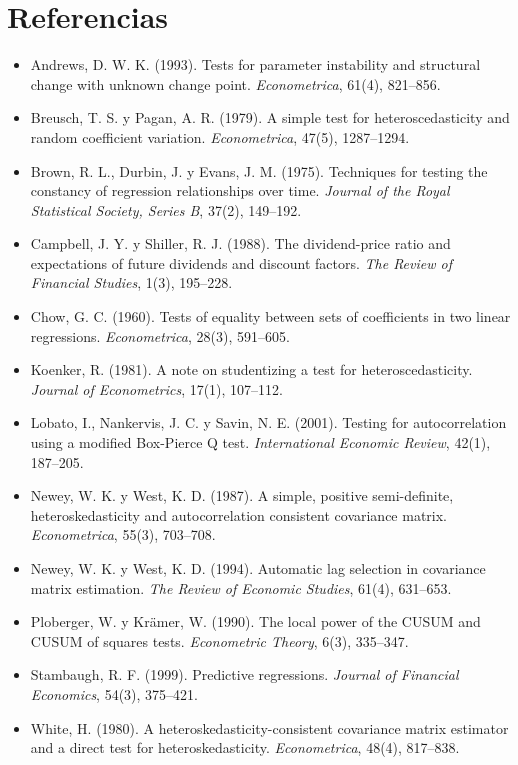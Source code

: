 \section*{Referencias}
\begin{itemize}[leftmargin=*]
  \item Andrews, D. W. K. (1993). Tests for parameter instability and structural change with unknown change
        point. \emph{Econometrica}, 61(4), 821--856.
  \item Breusch, T. S. y Pagan, A. R. (1979). A simple test for heteroscedasticity and random coefficient
        variation. \emph{Econometrica}, 47(5), 1287--1294.
  \item Brown, R. L., Durbin, J. y Evans, J. M. (1975). Techniques for testing the constancy of regression
        relationships over time. \emph{Journal of the Royal Statistical Society, Series B}, 37(2), 149--192.
  \item Campbell, J. Y. y Shiller, R. J. (1988). The dividend-price ratio and expectations of future
        dividends and discount factors. \emph{The Review of Financial Studies}, 1(3), 195--228.
  \item Chow, G. C. (1960). Tests of equality between sets of coefficients in two linear regressions.
        \emph{Econometrica}, 28(3), 591--605.
  \item Koenker, R. (1981). A note on studentizing a test for heteroscedasticity. \emph{Journal of
        Econometrics}, 17(1), 107--112.
  \item Lobato, I., Nankervis, J. C. y Savin, N. E. (2001). Testing for autocorrelation using a modified
        Box-Pierce Q test. \emph{International Economic Review}, 42(1), 187--205.
  \item Newey, W. K. y West, K. D. (1987). A simple, positive semi-definite, heteroskedasticity and
        autocorrelation consistent covariance matrix. \emph{Econometrica}, 55(3), 703--708.
  \item Newey, W. K. y West, K. D. (1994). Automatic lag selection in covariance matrix estimation.
        \emph{The Review of Economic Studies}, 61(4), 631--653.
  \item Ploberger, W. y Krämer, W. (1990). The local power of the CUSUM and CUSUM of squares tests.
        \emph{Econometric Theory}, 6(3), 335--347.
  \item Stambaugh, R. F. (1999). Predictive regressions. \emph{Journal of Financial Economics}, 54(3),
        375--421.
  \item White, H. (1980). A heteroskedasticity-consistent covariance matrix estimator and a direct test for
        heteroskedasticity. \emph{Econometrica}, 48(4), 817--838.
\end{itemize}

